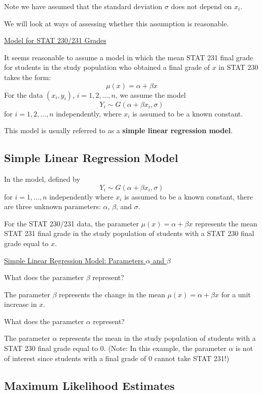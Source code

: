 \documentclass[oneside]{book}
\begin{document}
Note we have assumed that the standard deviation $ \sigma $ does not depend
on $ x_i $.

We will look at ways of assessing whether this assumption is reasonable.

\underline{Model for STAT 230/231 Grades}

It seems reasonable to assume a model in which the mean STAT 231 final grade for
students in the study population who obtained a final grade of $ x $
in STAT 230 takes the form:
\[\mu(x)=\alpha+\beta x\]
For the data $ (x_i,y_i) $, $ i=1,2,\ldots ,n $, we assume the model
\[Y_{i} \sim G\left(\alpha+\beta x_{i}, \sigma\right)\]
for $ i=1,2,\ldots ,n $ independently, where $ x_i $ is assumed to be a known constant.

This model is usually referred to as a \textbf{simple linear regression model}.

\subsection{Simple Linear Regression Model}
In the model, defined by
\[Y_{i} \sim G\left(\alpha+\beta x_{i}, \sigma\right)\]
for $ i=1,\ldots ,n $ independently where $ x_i $ is assumed to be a known constant,
there are three unknown parameters: $ \alpha $, $ \beta $, and $ \sigma $.

For the STAT 230/231 data, the parameter $ \mu(x)=\alpha+\beta x $ represents
the mean STAT 231 final grade in the study population of students with a STAT 230 final
grade equal to $ x $.

\underline{Simple Linear Regression Model: Parameters $ \alpha $ and $ \beta $}

What does the parameter $ \beta $ represent?

The parameter $ \beta $ represents the change in the mean
$ \mu(x)=\alpha+\beta x $ for a unit increase in $ x $.

What does the parameter $ \alpha $ represent?

The parameter $ \alpha $ represents the mean in the study population of students
with a STAT 230 final grade equal to $ 0 $. (Note: In this example, the parameter
$ \alpha $ is not of interest since students with a final grade of $ 0 $ cannot
take STAT 231!)

\subsection{Maximum Likelihood Estimates}
\end{document}
